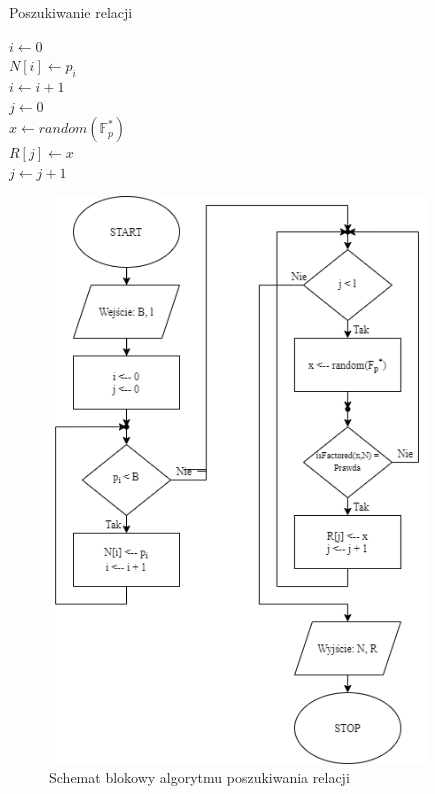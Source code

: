 \documentclass[]{article}
\begin{document}
\begin{algorithm}
	\SetAlgoLined
	\caption{Poszukiwanie relacji}
	\label{Relation}
	\(i \gets 0\) \\
	{
		\(N[i] \gets p_i\)\\
		\(i \gets i + 1\)\\
	}
	\(j \gets 0\) \\
	{
		\(x \gets random(\mathbb{F}_p^*)\)\\
		{
			\(R[j] \gets x\)\\
			\(j \gets j + 1\)\\
		}
	}
\end{algorithm}

\begin{figure}[H]
	\begin{center}
		\includegraphics[width=10cm]{./img/2.png}
		\caption{Schemat blokowy algorytmu poszukiwania relacji}
	\end{center}
\end{figure}
\end{document}
